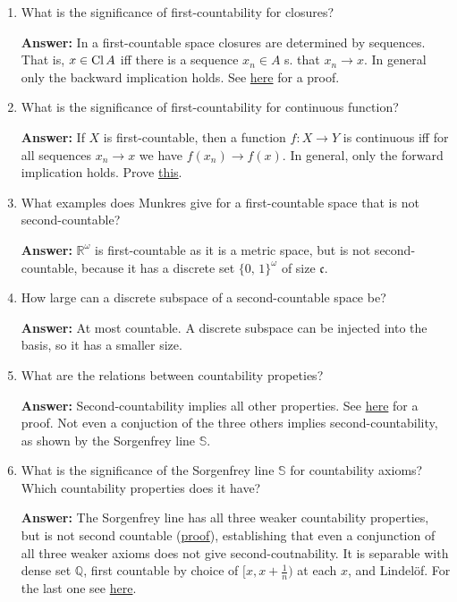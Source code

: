 \begin{enumerate}
    \item What is the significance of first-countability for closures?

    \textbf{Answer:} In a first-countable space closures are determined by sequences. That is, \( x \in \operatorname{Cl} A \) iff there is a sequence \( x_n \in A \) s. that \( x_n \to x \). In general only the backward implication holds. See \hyperlink{FirstCountableClosures}{here} for a proof.

    \item What is the significance of first-countability for continuous function?

    \textbf{Answer:} If \( X \) is first-countable, then a function \( f: X \to Y \) is continuous iff for all sequences \( x_n \to x \) we have \( f(x_n) \to f(x) \). In general, only the forward implication holds. Prove \hyperlink{FirstCountableContinuousFunctions}{this}.
    
    \item What examples does Munkres give for a first-countable space that is not second-countable?

        \textbf{Answer:} \( \mathbb{R}^\omega \) is first-countable as it is a metric space, but is not second-countable, because it has a discrete set \( \{ 0,\,1 \}^\omega \) of size \( \mathfrak{c} \).
    \item How large can a discrete subspace of a second-countable space be?
    
    \textbf{Answer:} At most countable. A discrete subspace can be injected into the basis, so it has a smaller size.
    \item What are the relations between countability propeties?

    \textbf{Answer:} Second-countability implies all other properties. See \hyperlink{MetrisableSpaceCountabilityProperties}{here} for a proof. Not even a conjuction of the three others implies second-countability, as shown by the Sorgenfrey line \( \mathbb{S} \).
    \item What is the significance of the Sorgenfrey line \( \mathbb{S} \) for countability axioms? Which countability properties does it have?

        \textbf{Answer: } The Sorgenfrey line has all three weaker countability properties, but is not second countable (\hyperlink{SorgenfreyLineNotSecondCountable}{proof}), establishing that even a conjunction of all three weaker axioms does not give second-coutnability. It is separable with dense set \( \mathbb{Q} \), first countable by choice of \( [x, x + \frac{1}{n}) \) at each \( x \), and Lindel\"of. For the last one see \hyperlink{SorgenfreyLineLindelof}{here}.


\end{enumerate}
